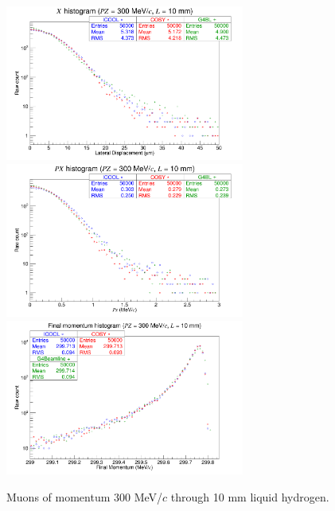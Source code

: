 \begin{figure}[H]
  \centering
    \includegraphics[width=0.7\textwidth]{Benchmarking/LH/X.300.10.png} 
    \includegraphics[width=0.7\textwidth]{Benchmarking/LH/PX.300.10.png} 
    \includegraphics[width=0.7\textwidth]{Benchmarking/LH/strag.300.10.png} 
  \caption{Muons of momentum 300 MeV/$c$ through 10 mm liquid hydrogen.}
  \label{fig:300.10}
\end{figure}

